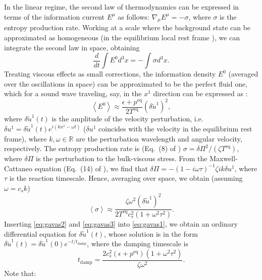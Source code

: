 \documentclass[aps,prd,twocolumn,a4paper,floatfix,nofootbib,superscriptaddress,nofootinbib]{revtex4}
\newcommand{\req}{\mathrm{eq}}
\begin{document}
In the linear regime, the second law of thermodynamics can be expressed in
terms of the information current $E^\mu$ as follows: $\nabla_\mu
E^\mu=-\sigma$, where $\sigma$ is the entropy production rate. Working at a
scale where the background state can be approximated as homogeneous (in the equilibrium
local rest frame \cite{MTW_book}), we can integrate the second law in space,
obtaining
%
\begin{equation}\label{eq:gavas1}
%
\dfrac{d}{dt} \int E^0 d^3x = -\int \sigma d^3 x .
%
\end{equation}
%
Treating viscous effects as small corrections, the information density $E^0$
(averaged over the oscillations in space) can be approximated to be the perfect
fluid one, which for a sound wave traveling, say, in the $x^1$ direction can be
expressed as \cite{Gavassino21stable}:
%
\begin{equation}\label{eq:gavas2}
%
\left<E^0\right> \approx \dfrac{\epsilon+p^\req}{2T^\req} (\delta \tilde{u}^1)^2 ,
%
\end{equation}
%
where $\delta \tilde{u}^1(t)$ is the amplitude of the velocity perturbation,
i.e.~$\delta u^1{=}\delta \tilde{u}^1(t) e^{i(kx^1-\omega t)}$ ($\delta u^1$
coincides with the velocity in the equilibrium rest frame), where $k,\omega
\in \mathbb{R}$ are the perturbation wavelength and angular velocity, respectively.
The entropy production rate is (Eq.~(8) of \citet{Camelio22a}) $\sigma=\delta \Pi^2/(\zeta T^\req)
$, where $\delta \Pi$ is the perturbation to the bulk-viscous stress. From the
Maxwell-Cattaneo equation (Eq.~(14) of \citet{Camelio22a}), we find that $\delta \Pi=-(1-i\omega \tau)^{-1}\zeta
ik\delta u^1$, where $\tau$ is the reaction timescale. Hence, averaging over space, we obtain (assuming $\omega=c_s k$)
%
\begin{equation}\label{eq:gavas3}
%
\left<\sigma\right> \approx \dfrac{\zeta \omega^2 (\delta \tilde{u}^1)^2}{2T^\req c_s^2(1+\omega^2 \tau^2)} .
%
\end{equation}
%
Inserting \eqref{eq:gavas2} and \eqref{eq:gavas3} into \eqref{eq:gavas1}, we
obtain an ordinary differential equation for $\delta \tilde{u}^1(t)$, whose solution
is in the form $\delta \tilde{u}^1(t)=\delta \tilde{u}^1(0)e^{-t/t_{\text{damp}}}$, where
the damping timescale is
%
\begin{equation}
\label{eq:tdamp}
%
t_{\text{damp}}= \dfrac{2c_s^2(\epsilon+p^\req)(1+\omega^2 \tau^2)}{\zeta \omega^2} .
%
\end{equation}
%
Note that:
%
\end{document}
